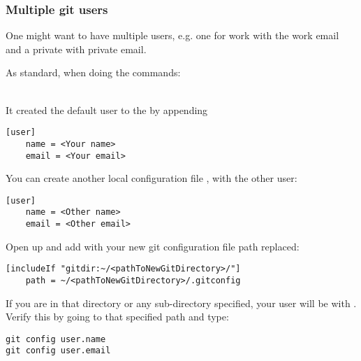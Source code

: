 \subsubsection{Multiple git users}

One might want to have multiple users, e.g. one for work with the work email and a private with private email.

As standard, when doing the commands:\\
\\

It created the default user to the  by appending
\begin{verbatim}
[user]
    name = <Your name>
    email = <Your email>
\end{verbatim}

You can create another local configuration file , with the other user:
\begin{verbatim}
[user]
    name = <Other name>
    email = <Other email>
\end{verbatim}

Open up  and add \code{[includeIf ...]} with your new git configuration file path replaced:
\begin{verbatim}
[includeIf "gitdir:~/<pathToNewGitDirectory>/"]
    path = ~/<pathToNewGitDirectory>/.gitconfig
\end{verbatim}

If you are in that directory or any sub-directory specified, your user will be  with . Verify this by going to that specified path and type:

\begin{verbatim}
git config user.name
git config user.email
\end{verbatim}

